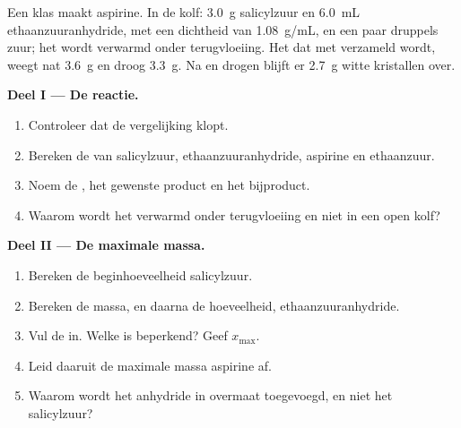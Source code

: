 \begin{problem}
\label{pb:g10:synthesis-yield:1}
Een klas maakt aspirine. In de kolf: \qty{3.0}{g} salicylzuur en
\qty{6.0}{mL} ethaanzuuranhydride, met een dichtheid van
\qty{1.08}{g/mL}, en een paar druppels zuur; het  wordt verwarmd
onder terugvloeiing. Het  dat met  verzameld
wordt, weegt nat \qty{3.6}{g} en droog \qty{3.3}{g}. Na 
en drogen blijft er \qty{2.7}{g} witte kristallen over.

\medskip
\noindent\textbf{Deel I --- De reactie.}
\begin{enumerate}
  \item Controleer dat de vergelijking
         klopt.
  \item Bereken de  van salicylzuur,
        ethaanzuuranhydride, aspirine en ethaanzuur.
  \item Noem de , het gewenste product en het bijproduct.
  \item Waarom wordt het  verwarmd onder terugvloeiing en niet in
        een open kolf?
\end{enumerate}

\medskip
\noindent\textbf{Deel II --- De maximale massa.}
\begin{enumerate}[resume]
  \item Bereken de beginhoeveelheid salicylzuur.
  \item Bereken de massa, en daarna de hoeveelheid, ethaanzuuranhydride.
  \item Vul de  in. Welke  is beperkend? Geef
        $x_{\max}$.
  \item Leid daaruit de maximale massa aspirine af.
  \item Waarom wordt het anhydride in overmaat toegevoegd, en niet het
        salicylzuur?
\end{enumerate}


\end{problem}
